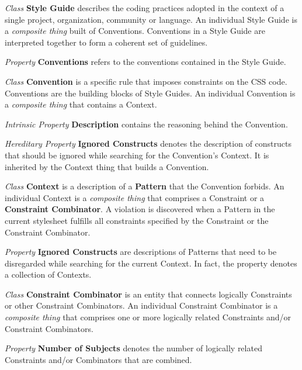 \begin{description}

\item\textit{Class} \textbf{Style Guide} describes the coding practices
adopted  in the context of a single project, organization, community or
language. An individual Style Guide is a \textit{composite thing} built of
Conventions. Conventions in a Style Guide are interpreted
together to form a coherent set of guidelines.

\textit{Property} \textbf{Conventions} refers to the conventions contained in the Style Guide.


\item\textit{Class} \textbf{Convention} is a specific rule that imposes constraints on the CSS code. Conventions are the building blocks of Style Guides. An individual Convention is a \textit{composite thing} that contains a Context.

\textit{Intrinsic Property} \textbf{Description} contains the reasoning behind the Convention.

\textit{Hereditary Property} \textbf{Ignored Constructs} denotes the description of constructs that should be ignored while searching for the Convention's Context. It is inherited by the Context thing that builds a Convention.


\item\textit{Class} \textbf{Context} is a description of a \textbf{Pattern} that the Convention forbids. An individual Context is a \textit{composite thing} that comprises a Constraint or a \textbf{Constraint Combinator}. A violation is discovered when a Pattern in the current stylesheet fulfills all constraints specified by the Constraint or the Constraint Combinator.

\textit{Property} \textbf{Ignored Constructs} are descriptions of Patterns that need to be disregarded while searching for the current Context. In fact, the property denotes a collection of Contexts.






\item\textit{Class} \textbf{Constraint Combinator} is an entity that connects logically Constraints or other Constraint Combinators. An individual Constraint Combinator is a \textit{composite thing} that comprises one or more logically related Constraints and/or Constraint Combinators.

\textit{Property} \textbf{Number of Subjects} denotes the number of logically related Constraints and/or Combinators that are combined.


\end{description}
